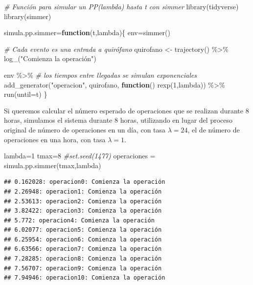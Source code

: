 \documentclass[
]{book}
\newenvironment{Shaded}{\begin{snugshade}}{\end{snugshade}}
\newcommand{\AttributeTok}[1]{\textcolor[rgb]{0.77,0.63,0.00}{#1}}
\newcommand{\CommentTok}[1]{\textcolor[rgb]{0.56,0.35,0.01}{\textit{#1}}}
\newcommand{\ControlFlowTok}[1]{\textcolor[rgb]{0.13,0.29,0.53}{\textbf{#1}}}
\newcommand{\DecValTok}[1]{\textcolor[rgb]{0.00,0.00,0.81}{#1}}
\newcommand{\FunctionTok}[1]{\textcolor[rgb]{0.00,0.00,0.00}{#1}}
\newcommand{\NormalTok}[1]{#1}
\newcommand{\OtherTok}[1]{\textcolor[rgb]{0.56,0.35,0.01}{#1}}
\newcommand{\SpecialCharTok}[1]{\textcolor[rgb]{0.00,0.00,0.00}{#1}}
\newcommand{\StringTok}[1]{\textcolor[rgb]{0.31,0.60,0.02}{#1}}
\theoremstyle{definition}
\theoremstyle{definition}
\theoremstyle{definition}
\theoremstyle{definition}
\theoremstyle{remark}
\begin{document}
\begin{Shaded}
\begin{Highlighting}[]
\CommentTok{\# Función para simular un PP(lambda) hasta t con simmer}
\FunctionTok{library}\NormalTok{(tidyverse)}
\FunctionTok{library}\NormalTok{(simmer)}

\NormalTok{simula.pp.simmer}\OtherTok{=}\ControlFlowTok{function}\NormalTok{(t,lambda)\{}
\NormalTok{env}\OtherTok{=}\FunctionTok{simmer}\NormalTok{()}

\CommentTok{\# Cada evento es una entrada a quirófano}
\NormalTok{quirofano }\OtherTok{\textless{}{-}} \FunctionTok{trajectory}\NormalTok{() }\SpecialCharTok{\%\textgreater{}\%}
  \FunctionTok{log\_}\NormalTok{(}\StringTok{"Comienza la operación"}\NormalTok{)}
 
\NormalTok{env }\SpecialCharTok{\%\textgreater{}\%}
  \CommentTok{\# los tiempos entre llegadas se simulan exponenciales}
  \FunctionTok{add\_generator}\NormalTok{(}\StringTok{"operacion"}\NormalTok{, quirofano, }\ControlFlowTok{function}\NormalTok{() }\FunctionTok{rexp}\NormalTok{(}\DecValTok{1}\NormalTok{,lambda)) }\SpecialCharTok{\%\textgreater{}\%}
  \FunctionTok{run}\NormalTok{(}\AttributeTok{until=}\NormalTok{t)}
\NormalTok{\}}
\end{Highlighting}
\end{Shaded}

Si queremos calcular el número esperado de operaciones que se realizan durante 8 horas, simulamos el sistema durante 8 horas, utilizando en lugar del proceso original de número de operaciones en un día, con tasa \(\lambda=24\), el de número de operaciones en una hora, con tasa \(\lambda=1\).

\begin{Shaded}
\begin{Highlighting}[]
\NormalTok{lambda}\OtherTok{=}\DecValTok{1}
\NormalTok{tmax}\OtherTok{=}\DecValTok{8}
\CommentTok{\#set.seed(1477)}
\NormalTok{operaciones }\OtherTok{=} \FunctionTok{simula.pp.simmer}\NormalTok{(tmax,lambda)}
\end{Highlighting}
\end{Shaded}

\begin{verbatim}
## 0.162028: operacion0: Comienza la operación
## 2.26948: operacion1: Comienza la operación
## 2.53613: operacion2: Comienza la operación
## 3.82422: operacion3: Comienza la operación
## 5.772: operacion4: Comienza la operación
## 6.02077: operacion5: Comienza la operación
## 6.25954: operacion6: Comienza la operación
## 6.63566: operacion7: Comienza la operación
## 7.28285: operacion8: Comienza la operación
## 7.56707: operacion9: Comienza la operación
## 7.94946: operacion10: Comienza la operación
\end{verbatim}
\end{document}
